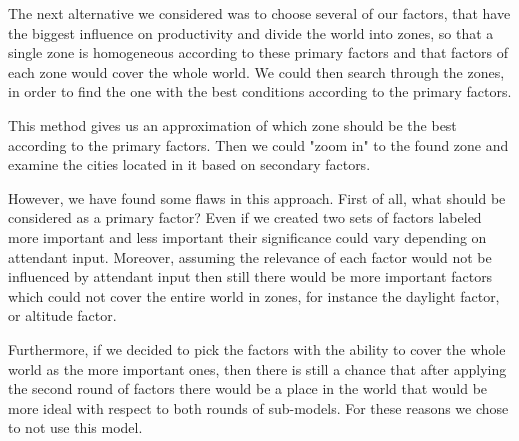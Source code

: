 
The next alternative we considered was to choose several of our factors, that have the biggest influence on productivity and divide the world into zones, so that a single zone is homogeneous according to these primary factors and that factors of each zone would cover the whole world. We could then search through the zones, in order to find the one with the best conditions according to the primary factors. 

This method gives us an approximation of which zone should be the best according to the primary factors. Then we could "zoom in" to the found zone and examine the cities located in it based on secondary factors. 

However, we have found some flaws in this approach. First of all, what should be considered as a primary factor? Even if we created two sets of factors labeled more important and less important their significance could vary depending on attendant input. Moreover, assuming the relevance of each factor would not be influenced by attendant input then still there would be more important factors which could not cover the entire world in zones, for instance the daylight factor, or altitude factor. 

Furthermore, if we decided to pick the factors with the ability to cover the whole world as the more important ones, then there is still a chance that after applying the second round of factors there would be a place in the world that would be more ideal with respect to both rounds of sub-models. For these reasons we chose to not use this model.
